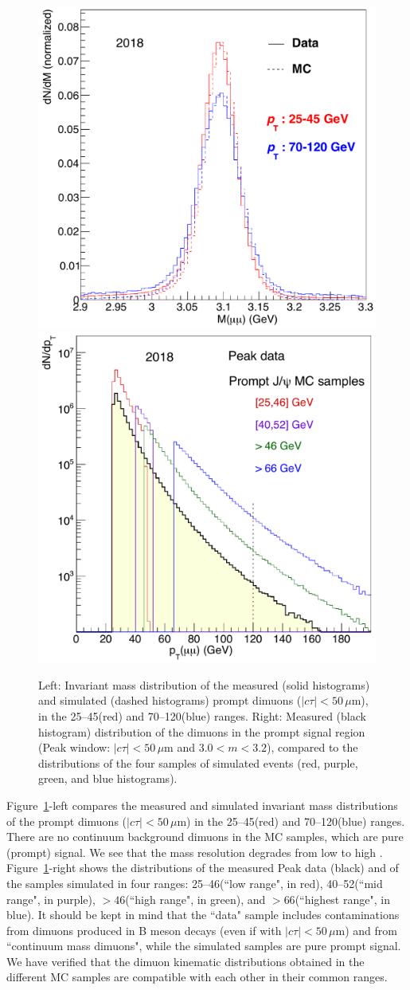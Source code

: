 \begin{figure}[h]
\centering
\includegraphics[width=0.485\linewidth]{Figures/chapter2/m_scale2.pdf}
\includegraphics[width=0.475\linewidth]{Figures/chapter2/pt_all2.pdf}
\caption{Left: Invariant mass distribution of the measured (solid histograms) 
and simulated (dashed histograms) prompt dimuons ($|c\tau| < 50\,\mu$m), 
in the 25--45\GeV (red) and 70--120\GeV (blue) \pt ranges.
Right: Measured (black histogram) \pt distribution of the dimuons 
in the prompt \jpsi signal region 
(Peak window: $|c\tau| < 50\,\mu$m and $3.0 < m < 3.2$\GeV), 
compared to the distributions of the four samples of simulated events
(red, purple, green, and blue histograms).}
\label{fig:Jpsi_mass_pt}
\end{figure}

Figure~\ref{fig:Jpsi_mass_pt}-left compares the measured and simulated 
invariant mass distributions of the prompt dimuons ($|c\tau| < 50\,\mu$m)
in the 25--45\GeV (red) and 70--120\GeV (blue) \pt ranges.
There are no continuum background dimuons in the MC samples, 
which are pure (prompt) signal. 
We see that the mass resolution degrades from low to high \pt.
Figure~\ref{fig:Jpsi_mass_pt}-right shows the \pt distributions 
of the measured Peak data (black)
and of the samples simulated in four \pt ranges:
25--46\GeV (``low \pt range", in red),
40--52\GeV (``mid \pt range", in purple),
$>46$\GeV (``high \pt range", in green), and
$>66$\GeV (``highest \pt range", in blue).
It should be kept in mind that the ``data" sample includes contaminations from
\jpsi dimuons produced in B meson decays (even if with $|c\tau| < 50\,\mu$m)
and from ``continuum mass dimuons",
while the simulated samples are pure prompt \jpsi signal.
We have verified that the dimuon kinematic distributions obtained in the
different MC samples are compatible with each other in their common \pt ranges.

